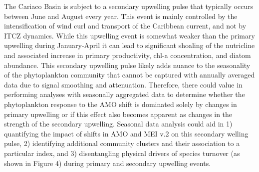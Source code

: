 \documentclass[12pt,english]{reviewresponse}
\begin{document}
\begin{revcomment}
	The Cariaco Basin is subject to a secondary upwelling pulse that typically occurs between June and August every year. This event is mainly controlled by the intensification of wind curl and transport of the Caribbean current, and not by ITCZ dynamics. While this upwelling event is somewhat weaker than the primary upwelling during January-April it can lead to significant shoaling of the nutricline and associated increase in primary productivity, chl-a concentration, and diatom abundance. This secondary upwelling pulse likely adds nuance to the seasonality of the phytoplankton community that cannot be captured with annually averaged data due to signal smoothing and attenuation. Therefore, there could value in performing analyses with seasonally aggregated data to determine whether the phytoplankton response to the AMO shift is dominated solely by changes in primary upwelling or if this effect also becomes apparent as changes in the strength of the secondary upwelling. Seasonal data analysis could aid in 1) quantifying the impact of shifts in AMO and MEI v.2 on this secondary welling pulse, 2) identifying additional community clusters and their association to a particular index, and 3) disentangling physical drivers of species turnover (as shown in Figure 4) during primary and secondary upwelling events.
\end{revcomment}
\end{document}
